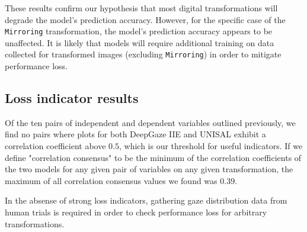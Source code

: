 These results confirm our hypothesis that most digital transformations will degrade the model's prediction accuracy. However, for the specific case of the \verb|Mirroring| transformation, the model's prediction accuracy appears to be unaffected. It is likely that models will require additional training on data collected for transformed images (excluding \verb|Mirroring|) in order to mitigate performance loss.

\subsection{Loss indicator results}

Of the ten pairs of independent and dependent variables outlined previously, we find no pairs where plots for both DeepGaze IIE \cite{deepgazeiie} and UNISAL \cite{unisal} exhibit a correlation coefficient above $0.5$, which is our threshold for useful indicators. If we define "correlation consensus" to be the minimum of the correlation coefficients of the two models for any given pair of variables on any given transformation, the maximum of all correlation consensus values we found was $0.39$.

In the absense of strong loss indicators, gathering gaze distribution data from human trials is required in order to check performance loss for arbitrary transformations.
